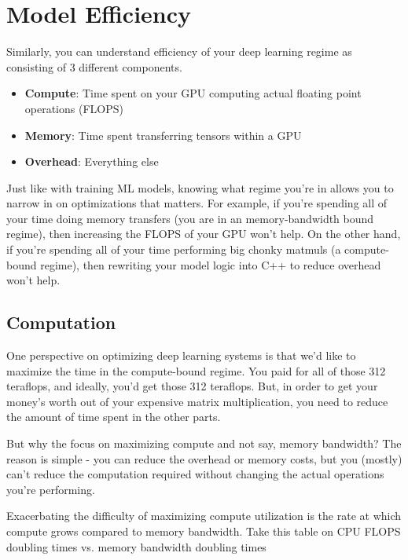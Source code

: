 \chapter{Model Efficiency}

Similarly, you can understand efficiency of your deep learning regime as consisting of 3 different components.
\begin{itemize}
	\item \textbf{Compute}: Time spent on your GPU computing actual floating point operations (FLOPS)
	\item \textbf{Memory}: Time spent transferring tensors within a GPU
	\item \textbf{Overhead}: Everything else
\end{itemize}

Just like with training ML models, knowing what regime you're in allows you to narrow in on optimizations that matters. For example, if you're spending all of your time doing memory transfers (\ie you are in an memory-bandwidth bound regime), then increasing the FLOPS of your GPU won't help. On the other hand, if you're spending all of your time performing big chonky matmuls (\ie a compute-bound regime), then rewriting your model logic into C++ to reduce overhead won't help.

\section{Computation}

One perspective on optimizing deep learning systems is that we'd like to maximize the time in the compute-bound regime. You paid for all of those 312 teraflops, and ideally, you'd get those 312 teraflops. But, in order to get your money's worth out of your expensive matrix multiplication, you need to reduce the amount of time spent in the other parts.

But why the focus on maximizing compute and not say, memory bandwidth? The reason is simple - you can reduce the overhead or memory costs, but you (mostly) can't reduce the computation required without changing the actual operations you're performing.

Exacerbating the difficulty of maximizing compute utilization is the rate at which compute grows compared to memory bandwidth. Take this table on CPU FLOPS doubling times vs. memory bandwidth doubling times



